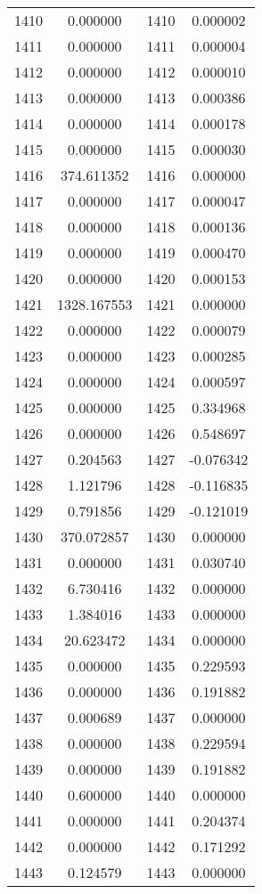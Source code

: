 \documentclass[12pt]{article}
\begin{document}
\begin{longtable}{@{}cccc@{}}
1410 & 0.000000 & 1410 & 0.000002 \\
1411 & 0.000000 & 1411 & 0.000004 \\
1412 & 0.000000 & 1412 & 0.000010 \\
1413 & 0.000000 & 1413 & 0.000386 \\
1414 & 0.000000 & 1414 & 0.000178 \\
1415 & 0.000000 & 1415 & 0.000030 \\
1416 & 374.611352 & 1416 & 0.000000 \\
1417 & 0.000000 & 1417 & 0.000047 \\
1418 & 0.000000 & 1418 & 0.000136 \\
1419 & 0.000000 & 1419 & 0.000470 \\
1420 & 0.000000 & 1420 & 0.000153 \\
1421 & 1328.167553 & 1421 & 0.000000 \\
1422 & 0.000000 & 1422 & 0.000079 \\
1423 & 0.000000 & 1423 & 0.000285 \\
1424 & 0.000000 & 1424 & 0.000597 \\
1425 & 0.000000 & 1425 & 0.334968 \\
1426 & 0.000000 & 1426 & 0.548697 \\
1427 & 0.204563 & 1427 & -0.076342 \\
1428 & 1.121796 & 1428 & -0.116835 \\
1429 & 0.791856 & 1429 & -0.121019 \\
1430 & 370.072857 & 1430 & 0.000000 \\
1431 & 0.000000 & 1431 & 0.030740 \\
1432 & 6.730416 & 1432 & 0.000000 \\
1433 & 1.384016 & 1433 & 0.000000 \\
1434 & 20.623472 & 1434 & 0.000000 \\
1435 & 0.000000 & 1435 & 0.229593 \\
1436 & 0.000000 & 1436 & 0.191882 \\
1437 & 0.000689 & 1437 & 0.000000 \\
1438 & 0.000000 & 1438 & 0.229594 \\
1439 & 0.000000 & 1439 & 0.191882 \\
1440 & 0.600000 & 1440 & 0.000000 \\
1441 & 0.000000 & 1441 & 0.204374 \\
1442 & 0.000000 & 1442 & 0.171292 \\
1443 & 0.124579 & 1443 & 0.000000 \\

\end{longtable}
\end{document}
